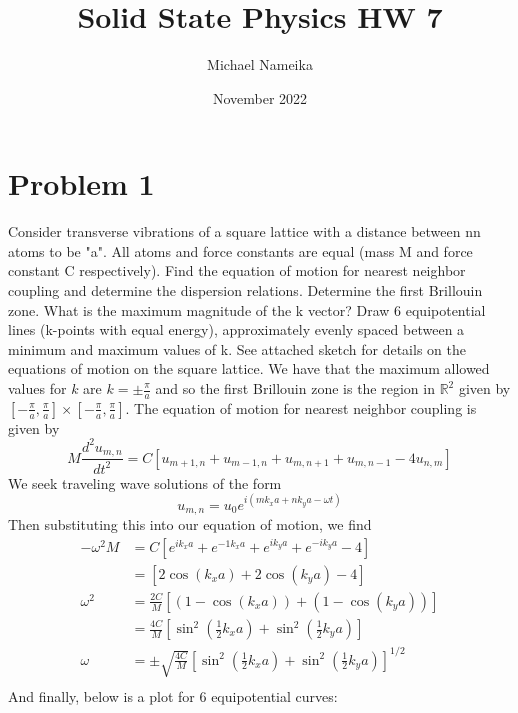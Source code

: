 \documentclass{article}
\title{Solid State Physics HW 7}
\author{Michael Nameika}
\date{November 2022}
\begin{document}
\maketitle

\section*{Problem 1}
Consider transverse vibrations of a square lattice with a distance between nn atoms to be "a". All atoms and force constants are equal (mass M and force constant C respectively). Find the equation of motion for nearest neighbor coupling and determine the dispersion relations. Determine the first Brillouin zone. What is the maximum magnitude of the k vector? Draw 6 equipotential lines (k-points with equal energy), approximately evenly spaced between a minimum and maximum values of k.
\newline\newline
See attached sketch for details on the equations of motion on the square lattice. We have that the maximum allowed values for $k$ are $k = \pm\frac{\pi}{a}$ and so the first Brillouin zone is the region in $\mathbb{R}^2$ given by $\left[-\frac{\pi}{a},\frac{\pi}{a}\right] \times \left[-\frac{\pi}{a},\frac{\pi}{a}\right]$. The equation of motion for nearest neighbor coupling is given by
\[M\frac{d^2u_{m,n}}{dt^2} = C[u_{m+1,n} + u_{m-1,n} + u_{m,n+1} + u_{m,n-1} - 4u_{n,m}]\]
We seek traveling wave solutions of the form
\[u_{m,n} = u_0e^{i(mk_xa + nk_ya - \omega t)}\]
Then substituting this into our equation of motion, we find
\begin{align*}
    -\omega^2M &= C\left[e^{ik_xa}+e^{-1k_xa} + e^{ik_ya} + e^{-ik_ya} - 4\right] \\
    &= \left[2\cos{(k_xa)} + 2\cos{(k_ya)} - 4\right] \\
    \omega^2 &= \frac{2C}{M}\left[(1-\cos{(k_xa)}) + (1-\cos{(k_ya)})\right] \\
    &= \frac{4C}{M}\left[\sin^2{\left(\frac{1}{2}k_xa\right)} + \sin^2{\left(\frac{1}{2}k_ya\right)}\right] \\
    \omega &= \pm\sqrt{\frac{4C}{M}}\left[\sin^2{\left(\frac{1}{2}k_xa\right)} + \sin^2{\left(\frac{1}{2}k_ya\right)}\right]^{1/2}\\
\end{align*}
And finally, below is a plot for 6 equipotential curves:
\end{document}
